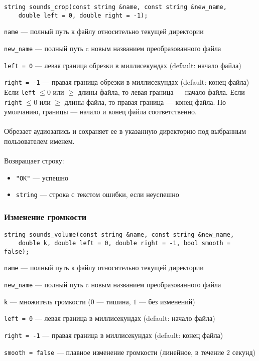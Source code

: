 \documentclass[14pt,a4paper]{article}
\begin{document}
\begin{lstlisting}
string sounds_crop(const string &name, const string &new_name, 
	double left = 0, double right = -1);
\end{lstlisting}

\lstinline{name} --- полный путь к файлу относительно текущей директории \par
\lstinline{new_name} --- полный путь c новым названием преобразованного файла \par
\lstinline{left = 0} --- левая граница обрезки в миллисекундах (default: начало файла) \par
\lstinline{right = -1} --- правая граница обрезки в миллисекундах (default: конец файла) \\

\noindent Если \lstinline{left} $\leq 0$ или $\geq$ длины файла, то левая граница --- начало файла. Если \lstinline{right} $\leq 0$ или $\geq$ длины файла, то правая граница --- конец файла. По умолчанию, границы --- начало и конец файла соответственно. \\\\
Обрезает аудиозапись и сохраняет ее в указанную директорию под выбранным пользователем именем. \\\\
Возвращает строку:
\smallskip
\begin{itemize}
\item \lstinline{"OK"} --- успешно
\item \lstinline{string} --- строка с текстом ошибки, если неуспешно
\end{itemize}

\subsubsection*{Изменение громкости}

\begin{lstlisting}
string sounds_volume(const string &name, const string &new_name, 
	double k, double left = 0, double right = -1, bool smooth = false);
\end{lstlisting}

\lstinline{name} --- полный путь к файлу относительно текущей директории \par
\lstinline{new_name} --- полный путь c новым названием преобразованного файла \par
\lstinline{k} --- множитель громкости ($0$ --- тишина, $1$ --- без изменений)\par
\lstinline{left = 0} --- левая граница в миллисекундах (default: начало файла) \par
\lstinline{right = -1} --- правая граница в миллисекундах (default: конец файла) \par
\lstinline{smooth = false} --- плавное изменение громкости (линейное, в течение $2$ секунд) \\
\end{document}
